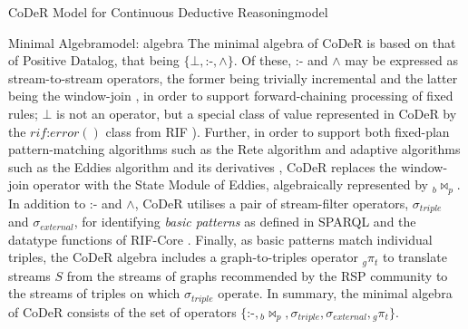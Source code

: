 \begin{nestedsection}{CoDeR Model for Continuous Deductive Reasoning}{model}
	\begin{nestedsection}{Minimal Algebra}{model: algebra}
		The minimal algebra of CoDeR is based on that of Positive Datalog, that being ${\{\bot, \text{:-}, \wedge\}}$.
		Of these, $\text{:-}$ and $\wedge$ may be expressed as stream-to-stream operators, the former being trivially incremental and the latter being the window-join \citep{ReteDBMS}, in order to support forward-chaining processing of fixed rules;
		$\bot$ is not an operator, but a special class of value represented in CoDeR by the ${rif\text{:}error()}$ class from RIF \citep{w3crif}).
		Further, in order to support both fixed-plan pattern-matching algorithms such as the Rete algorithm \citep{forgy79} and adaptive algorithms such as the Eddies algorithm \citep{eddies} and its derivatives \citep{CACQ,TCQ}, CoDeR replaces the window-join operator with the State Module of Eddies, algebraically represented by ${{}_b\Join_p}$.
		In addition to $\text{:-}$ and $\wedge$, CoDeR utilises a pair of stream-filter operators, $\sigma_{triple}$ and $\sigma_{external}$, for identifying \emph{basic patterns} as defined in SPARQL \citep{w3csparql} and the datatype functions of RIF-Core \citep{w3crifcore}.
		Finally, as basic patterns match individual triples, the CoDeR algebra includes a graph-to-triples operator ${{}_g\pi_t}$ to translate streams $S$ from the streams of graphs recommended by the RSP community to the streams of triples on which $\sigma_{triple}$ operate.
		In summary, the minimal algebra of CoDeR consists of the set of operators ${\{\text{:-}, {}_b\Join_p, \sigma_{triple}, \sigma_{external}, {}_g\pi_t\}}$.


\end{nestedsection}
\end{nestedsection}
